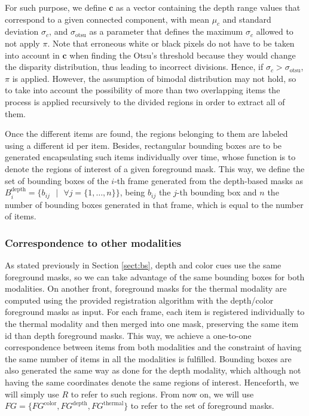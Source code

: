 \documentclass[10pt,twocolumn,letterpaper]{article}
\begin{document}
For such purpose, we define $\mathbf{c}$ as a vector containing the depth range values that correspond to a given connected component, with mean $\mu_{c}$ and standard deviation $\sigma_{c}$, and $\sigma_\mathrm{otsu}$ as a parameter that defines the maximum $\sigma_{c}$ allowed to not apply $\pi$. Note that erroneous white or black pixels do not have to be taken into account in $\mathbf{c}$ when finding the Otsu's threshold because they would change the disparity distribution, thus leading to incorrect divisions. Hence, if $\sigma_{c} > \sigma_\mathrm{otsu}$,  $\pi$ is applied. However, the assumption of bimodal distribution may not hold, so to take into account the possibility of more than two overlapping items the process is applied recursively to the divided regions in order to extract all of them. 

Once the different items are found, the regions belonging to them are labeled using a different id per item. Besides, rectangular bounding boxes are to be generated encapsulating such items individually over time, whose function is to denote the regions of interest of a given foreground mask. This way, we define the set of bounding boxes of the $i$-th frame generated from the depth-based masks as $B^\mathrm{depth}_i = \{b_{ij}\text{ }|\text{ }\forall j = \{1, \ldots, n\} \}$, being $b_{ij}$ the $j$-th bounding box and $n$ the number of bounding boxes generated in that frame, which is equal to the number of items.


\subsubsection{Correspondence to other modalities} 
\label{sssec:correspondence}
As stated previously in Section \ref{sect:bs}, depth and color cues use the same foreground masks, so we can take advantage of the same bounding boxes for both modalities. On another front, foreground masks for the thermal modality are computed using the provided registration algorithm with the depth/color foreground masks as input. For each frame, each item is registered individually to the thermal modality and then merged into one mask, preserving the same item id than depth foreground masks. This way, we achieve a one-to-one correspondence between items from both modalities and the constraint of having the same number of items in all the modalities is fulfilled. Bounding boxes are also generated the same way as done for the depth modality, which although not having the same coordinates denote the same regions of interest. Henceforth, we will simply use $R$ to refer to such regions. From now on, we will use $FG = \{FG^\mathrm{color}, FG^\mathrm{depth}, FG^\mathrm{thermal}\}$ to refer to the set of foreground masks.
\end{document}
